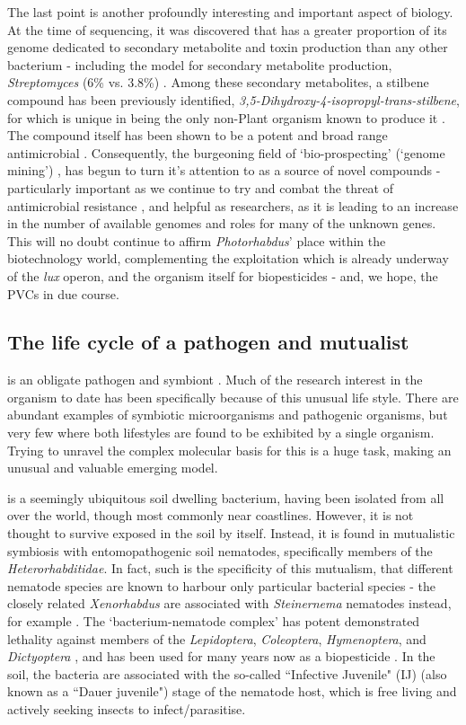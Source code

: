 The last point is another profoundly interesting and important aspect of \Pa{} biology. At the time of sequencing, it was discovered that \Pa{} has a greater proportion of its genome dedicated to secondary metabolite and toxin production than any other bacterium - including the model for secondary metabolite production, \emph{Streptomyces} (6\% vs. 3.8\%) \citep{Waterfield2009,Duchaud2003}. Among these secondary metabolites, a stilbene compound has been previously identified, \emph{3,5-Dihydroxy-4-isopropyl-trans-stilbene}, for which \Pa{} is unique in being the only non-Plant organism known to produce it \citep{Joyce2008}. The compound itself has been shown to be a potent and broad range antimicrobial \citep{Hu2000}.
Consequently, the burgeoning field of `bio-prospecting' (`genome mining') \citep{Shi2018}, has begun to turn it's attention to \Pa{} as a source of novel compounds - particularly important as we continue to try and combat the threat of antimicrobial resistance \citep{Orozco2016}, and helpful as \Pa{} researchers, as it is leading to an increase in the number of available genomes and roles for many of the unknown genes. This will no doubt continue to affirm \emph{Photorhabdus}' place within the biotechnology world, complementing the exploitation which is already underway of the \emph{lux} operon, and the organism itself for biopesticides - and, we hope, the PVCs in due course.

\subsection{The life cycle of a pathogen and mutualist}\label{lifecycle}
\Pa{} is an obligate pathogen and symbiont \citep{Ffrench-Constant2003}. Much of the research interest in the organism to date has been specifically because of this unusual life style. There are abundant examples of symbiotic microorganisms and pathogenic organisms, but very few where both lifestyles are found to be exhibited by a single organism. Trying to unravel the complex molecular basis for this is a huge task, making \Pa{} an unusual and valuable emerging model.

\Pa{} is a seemingly ubiquitous soil dwelling bacterium, having been isolated from all over the world, though most commonly near coastlines. However, it is not thought to survive exposed in the soil by itself. Instead, it is found in mutualistic symbiosis with entomopathogenic soil nematodes, specifically members of the \emph{Heterorhabditidae}. In fact, such is the specificity of this mutualism, that different nematode species are known to harbour only particular bacterial species - the closely related \emph{Xenorhabdus} are associated with \emph{Steinernema} nematodes instead, for example \citep{Chaston2011}. The `bacterium-nematode complex' has potent demonstrated lethality against members of the \emph{Lepidoptera}, \emph{Coleoptera}, \emph{Hymenoptera}, and \emph{Dictyoptera} \citep{Naidoo2015}, and has been used for many years now as a biopesticide \citep{Waterfield2009}. In the soil, the bacteria are associated with the so-called ``Infective Juvenile" (IJ) (also known as a ``Dauer juvenile") stage of the nematode host, which is free living and actively seeking insects to infect/parasitise. 

